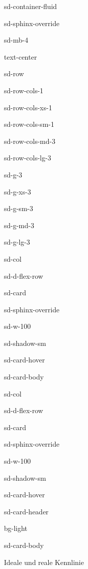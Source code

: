 \documentclass[letterpaper,10pt,english]{jupyterBook}
\let\sphinxpxdimen\pdfpxdimen\else\newdimen\sphinxpxdimen
\begin{document}
\begin{sphinxuseclass}{sd-container-fluid}
\begin{sphinxuseclass}{sd-sphinx-override}
\begin{sphinxuseclass}{sd-mb-4}
\begin{sphinxuseclass}{text-center}
\begin{sphinxuseclass}{sd-row}
\begin{sphinxuseclass}{sd-row-cols-1}
\begin{sphinxuseclass}{sd-row-cols-xs-1}
\begin{sphinxuseclass}{sd-row-cols-sm-1}
\begin{sphinxuseclass}{sd-row-cols-md-3}
\begin{sphinxuseclass}{sd-row-cols-lg-3}
\begin{sphinxuseclass}{sd-g-3}
\begin{sphinxuseclass}{sd-g-xs-3}
\begin{sphinxuseclass}{sd-g-sm-3}
\begin{sphinxuseclass}{sd-g-md-3}
\begin{sphinxuseclass}{sd-g-lg-3}
\begin{sphinxuseclass}{sd-col}
\begin{sphinxuseclass}{sd-d-flex-row}
\begin{sphinxuseclass}{sd-card}
\begin{sphinxuseclass}{sd-sphinx-override}
\begin{sphinxuseclass}{sd-w-100}
\begin{sphinxuseclass}{sd-shadow-sm}
\begin{sphinxuseclass}{sd-card-hover}
\begin{sphinxuseclass}{sd-card-body}
\end{sphinxuseclass}{\hyperref[\detokenize{content/1_Kurvenanpassung::doc}]{}}
\end{sphinxuseclass}
\end{sphinxuseclass}
\end{sphinxuseclass}
\end{sphinxuseclass}
\end{sphinxuseclass}
\end{sphinxuseclass}
\end{sphinxuseclass}
\begin{sphinxuseclass}{sd-col}
\begin{sphinxuseclass}{sd-d-flex-row}
\begin{sphinxuseclass}{sd-card}
\begin{sphinxuseclass}{sd-sphinx-override}
\begin{sphinxuseclass}{sd-w-100}
\begin{sphinxuseclass}{sd-shadow-sm}
\begin{sphinxuseclass}{sd-card-hover}
\begin{sphinxuseclass}{sd-card-header}
\begin{sphinxuseclass}{bg-light}
\sphinxAtStartPar
{}

\end{sphinxuseclass}
\end{sphinxuseclass}
\begin{sphinxuseclass}{sd-card-body}
\noindent\sphinxincludegraphics[height=120\sphinxpxdimen]{{reale_kennlinie}.png}

\sphinxAtStartPar
Ideale und reale Kennlinie


\end{sphinxuseclass}
\end{sphinxuseclass}
\end{sphinxuseclass}
\end{sphinxuseclass}
\end{sphinxuseclass}
\end{sphinxuseclass}
\end{sphinxuseclass}
\end{sphinxuseclass}
\end{sphinxuseclass}
\end{sphinxuseclass}
\end{sphinxuseclass}
\end{sphinxuseclass}
\end{sphinxuseclass}
\end{sphinxuseclass}
\end{sphinxuseclass}
\end{sphinxuseclass}
\end{sphinxuseclass}
\end{sphinxuseclass}
\end{sphinxuseclass}
\end{sphinxuseclass}
\end{sphinxuseclass}
\end{sphinxuseclass}
\end{sphinxuseclass}
\end{document}
